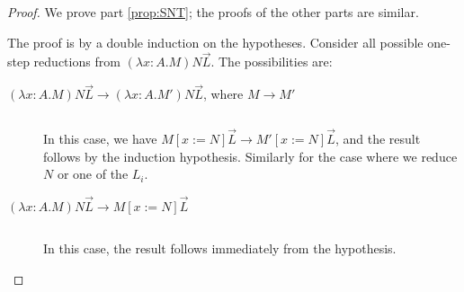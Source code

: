 \begin{proof}
We prove part \ref{prop:SNT}; the proofs of the other parts are similar.

The proof is by a double induction on the hypotheses.  Consider all possible one-step reductions from $(\lambda x:A.M) N \vec{L}$.  The possibilities are:
\begin{description}
\item[$(\lambda x:A.M) N \vec{L} \rightarrow (\lambda x:A.M')N \vec{L}$, where $M \rightarrow M'$]
$ $

In this case, we have $M[x:=N] \vec{L} \rightarrow M'[x:=N] \vec{L}$, and the result follows by the induction hypothesis.  Similarly for the case
where we reduce $N$ or one of the $L_i$.
\item[$(\lambda x:A.M)N \vec{L} \rightarrow M{[x:=N]} \vec{L}$]
$ $

In this case, the result follows immediately from the hypothesis.
\end{description}
\end{proof}

